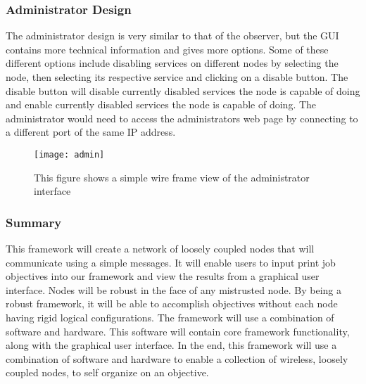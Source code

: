 \subsubsection{Administrator Design}
The administrator design is very similar to that of the observer, but the GUI contains more technical information and gives more options. Some of these different options include disabling services on different nodes by selecting the node, then selecting its respective service and clicking on a disable button. The disable button will disable currently disabled services the node is capable of doing and enable currently disabled services the node is capable of doing. 
The administrator would need to access the administrators web page by connecting to a different port of the same IP address.  
\begin{figure}[H]
\centering
\texttt{[image: admin]}
\captionsetup{justification=centering}
\caption{This figure shows a simple wire frame view of the administrator interface}
\end{figure}




\subsubsection{Summary}
This framework will create a network of loosely coupled nodes that will communicate using a simple messages. It will enable users to input print job objectives into our framework and view the results from a graphical user interface. Nodes will be robust in the face of any mistrusted node. By being a robust framework, it will be able to accomplish objectives without each node having rigid logical configurations. The framework will use a combination of software and hardware. This software will contain core framework functionality, along with the graphical user interface. In the end, this framework will use a combination of software and hardware to enable a collection of wireless, loosely coupled nodes, to self organize on an objective.

